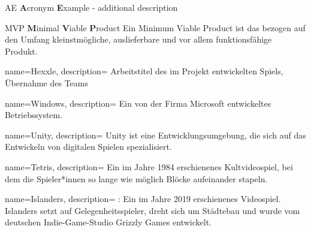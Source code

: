 %
%


\usepackage{xparse}

 {
	\makeglossaries
}





	{AE}
	{\textbf{A}cronym \textbf{E}xample - additional description}





	{MVP}
	{\textbf{M}inimal \textbf{V}iable \textbf{P}roduct}
	{
		Ein Minimum Viable Product ist das bezogen auf den Umfang kleinstmögliche, auslieferbare und vor allem funktionsfähige Produkt.
	}



{
	name=Hexxle,
	description={
		Arbeitstitel des im Projekt entwickelten Spiels, Übernahme des Teams
	}
}

{
	name=Windows,
	description={
		Ein von der Firma Microsoft entwickeltes Betriebssystem.
	}
}

{
	name=Unity,
	description={
		Unity ist eine Entwicklungsumgebung, die sich auf das Entwickeln von digitalen Spielen spezialisiert.
	}
}

{
	name=Tetris,
	description={
		Ein im Jahre 1984 erschienenes Kultvideospiel, bei dem die Spieler*innen so lange wie möglich Blöcke aufeinander stapeln.
	}
}

{
	name=Islanders,
	description={
		\cite{IslandersWiki}: Ein im Jahre 2019 erschienenes Videospiel. Islanders setzt auf Gelegenheitsspieler, dreht sich um Städtebau und wurde vom deutschen Indie-Game-Studio Grizzly Games entwickelt.
	}
}

